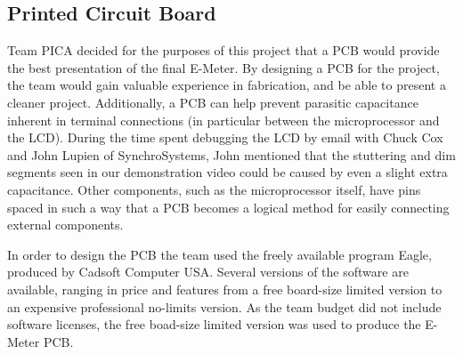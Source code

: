 \subsection{Printed Circuit Board}
Team PICA decided for the purposes of this project that a \ac{PCB} would provide the best presentation of the final E-Meter. By designing a \ac{PCB} for the project, the team would gain valuable experience in fabrication, and be able to present a cleaner project. Additionally, a \ac{PCB} can help prevent parasitic capacitance inherent in terminal connections (in particular between the microprocessor and the \ac{LCD}). During the time spent debugging the \ac{LCD} by email with Chuck Cox and John Lupien of SynchroSystems, John mentioned that the stuttering and dim segments seen in our demonstration video could be caused by even a slight extra capacitance. Other components, such as the microprocessor itself, have pins spaced in such a way that a \ac{PCB} becomes a logical method for easily connecting external components.

In order to design the \ac{PCB} the team used the freely available program Eagle, produced by Cadsoft Computer USA. Several versions of the software are available, ranging in price and features from a free board-size limited version to an expensive professional no-limits version. As the team budget did not include software licenses, the free boad-size limited version was used to produce the E-Meter \acs{PCB}. 

